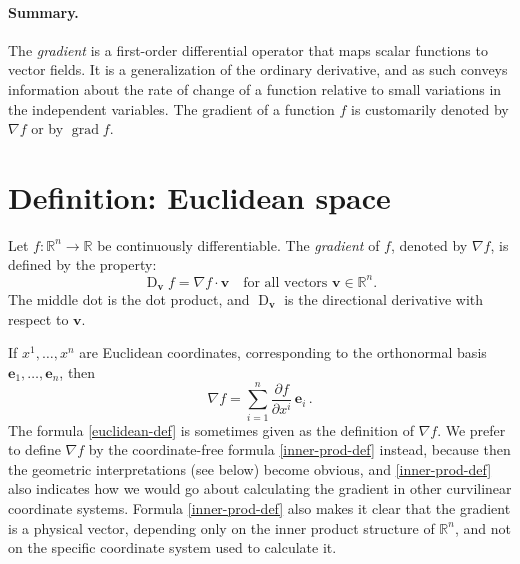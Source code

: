 \documentclass[12pt]{article}
\newcommand{\real}{\mathbb{R}}
\providecommand{\defnterm}[1]{\emph{#1}}
\DeclareMathOperator{\D}{D}
\newcommand{\vv}{\mathbf{v}}
\newcommand{\ve}{\mathbf{e}}
\newcommand{\grad}{\operatorname{grad}}
\begin{document}
\paragraph{Summary.}

The \defnterm{gradient} is a first-order differential operator that maps
scalar functions to vector fields. It is a generalization of the ordinary
derivative, and as such conveys information about the rate of change
of a function relative to small variations in the independent
variables. The gradient of a function $f$ is customarily denoted by
$\nabla f$ or by $\grad f$.
\tableofcontents

\section{Definition: Euclidean space}

Let $f\colon \real^n \to \real$ be continuously differentiable.
The \defnterm{gradient} of $f$, denoted by $\nabla f$, 
is defined 
by the property:
\begin{equation}\label{inner-prod-def}
\D_\vv f = \nabla f \cdot \vv \quad \text{for all vectors $\vv \in \real^n$.}
\end{equation}
The middle dot is the dot product,
and $\D_\vv$ is the directional derivative with respect to $\vv$.

\smallskip

If $x^1, \dotsc, x^n$ are Euclidean coordinates,
corresponding to the orthonormal basis $\ve_1, \dotsc, \ve_n$,
then
\begin{equation}\label{euclidean-def}
\nabla f = \sum_{i=1}^n \frac{\partial f}{\partial x^i}\, \ve_i\,.
\end{equation}
The formula \eqref{euclidean-def} is sometimes given as the definition of $\nabla f$.
We prefer to define $\nabla f$ by the coordinate-free formula \eqref{inner-prod-def} instead,
because then the geometric interpretations (see below) become obvious,
and \eqref{inner-prod-def} also indicates how we would go about
calculating the gradient in other curvilinear coordinate systems.
Formula \eqref{inner-prod-def} also makes it clear that the gradient
is a physical vector, depending only on the inner product structure of $\real^n$,
and not on the specific coordinate system used to calculate it.
\end{document}
